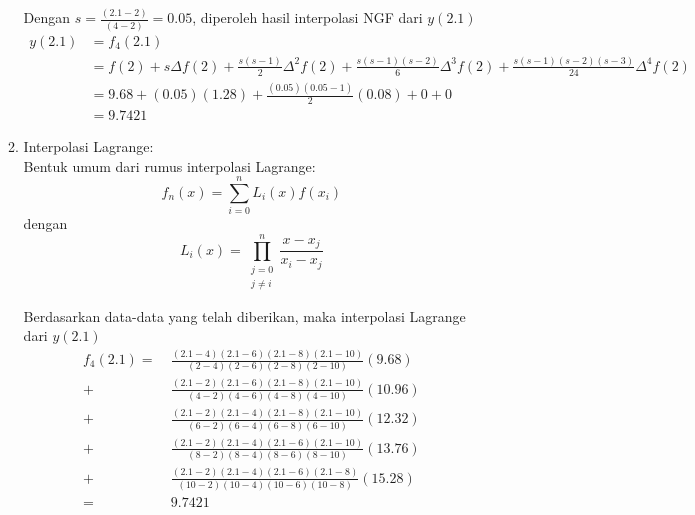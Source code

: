 \documentclass{article}
\begin{document}
\begin{enumerate}
\begin{enumerate}
        Dengan $s = \frac{(\num{2,1} - 2)}{(4 - 2)} = \num{0,05}$, diperoleh hasil interpolasi NGF dari $y(\num{2,1})$
        \begin{align*}
            y(\num{2,1}) &= f_4(\num{2,1}) \\
            &= f(2) + s\Delta f(2) + \frac{s(s-1)}{2}\Delta^2 f(2) + \frac{s(s-1)(s-2)}{6}\Delta^3 f(2) + \frac{s(s-1)(s-2)(s-3)}{24}\Delta^4 f(2) \\
            &= \num{9,68} + (\num{0,05})(\num{1,28}) + \frac{(\num{0,05})(\num{0,05} - 1)}{2}(\num{0,08}) + 0 + 0 \\
            &= \num{9,7421}
        \end{align*}

        \item Interpolasi Lagrange: \\
        Bentuk umum dari rumus interpolasi Lagrange:
        \begin{equation*}
            f_n(x) = \sum_{i = 0}^n L_i(x)f(x_i)
        \end{equation*}
        dengan
        \begin{equation*}
            L_i(x) = \prod_{\substack{j=0 \\ j \ne i}}^{n} \frac{x - x_j}{x_i - x_j}
        \end{equation*}

        Berdasarkan data-data yang telah diberikan, maka interpolasi Lagrange dari $y(\num{2,1})$
        \begin{align*}
        f_4(\num{2,1}) =\ 
        &\frac{(\num{2,1} - \num{4})(\num{2,1} - \num{6})(\num{2,1} - \num{8})(\num{2,1} - \num{10})}
            {(\num{2} - \num{4})(\num{2} - \num{6})(\num{2} - \num{8})(\num{2} - \num{10})}(\num{9,68}) \\
        +\, &\frac{(\num{2,1} - \num{2})(\num{2,1} - \num{6})(\num{2,1} - \num{8})(\num{2,1} - \num{10})}
            {(\num{4} - \num{2})(\num{4} - \num{6})(\num{4} - \num{8})(\num{4} - \num{10})}(\num{10,96}) \\
        +\, &\frac{(\num{2,1} - \num{2})(\num{2,1} - \num{4})(\num{2,1} - \num{8})(\num{2,1} - \num{10})}
            {(\num{6} - \num{2})(\num{6} - \num{4})(\num{6} - \num{8})(\num{6} - \num{10})}(\num{12,32}) \\
        +\, &\frac{(\num{2,1} - \num{2})(\num{2,1} - \num{4})(\num{2,1} - \num{6})(\num{2,1} - \num{10})}
            {(\num{8} - \num{2})(\num{8} - \num{4})(\num{8} - \num{6})(\num{8} - \num{10})}(\num{13,76}) \\
        +\, &\frac{(\num{2,1} - \num{2})(\num{2,1} - \num{4})(\num{2,1} - \num{6})(\num{2,1} - \num{8})}
            {(\num{10} - \num{2})(\num{10} - \num{4})(\num{10} - \num{6})(\num{10} - \num{8})}(\num{15,28}) \\
        =\, &\num{9,7421}
        \end{align*}
    \end{enumerate}


\end{enumerate}
\end{document}
